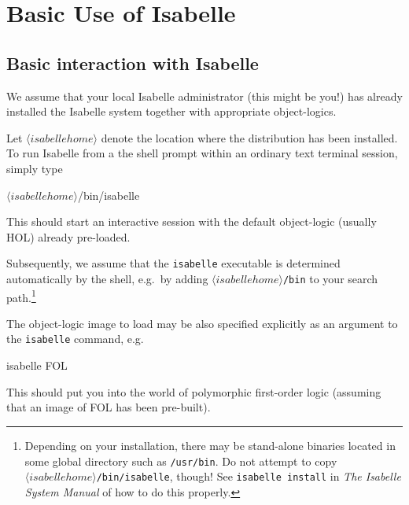 
\chapter{Basic Use of Isabelle} 

\section{Basic interaction with Isabelle}
\nobreak
%
We assume that your local Isabelle administrator (this might be you!) has
already installed the Isabelle system together with appropriate object-logics.

\medskip Let $\langle isabellehome \rangle$ denote the location where
the distribution has been installed.  To run Isabelle from a the shell
prompt within an ordinary text terminal session, simply type
\begin{ttbox}
\({\langle}isabellehome{\rangle}\)/bin/isabelle
\end{ttbox}
This should start an interactive \ML{} session with the default object-logic
(usually HOL) already pre-loaded.

Subsequently, we assume that the \texttt{isabelle} executable is determined
automatically by the shell, e.g.\ by adding {\tt \(\langle isabellehome
  \rangle\)/bin} to your search path.\footnote{Depending on your installation,
  there may be stand-alone binaries located in some global directory such as
  \texttt{/usr/bin}.  Do not attempt to copy {\tt \(\langle isabellehome
    \rangle\)/bin/isabelle}, though!  See \texttt{isabelle install} in
  \emph{The Isabelle System Manual} of how to do this properly.}

\medskip

The object-logic image to load may be also specified explicitly as an argument
to the {\tt isabelle} command, e.g.
\begin{ttbox}
isabelle FOL
\end{ttbox}
This should put you into the world of polymorphic first-order logic (assuming
that an image of FOL has been pre-built).

